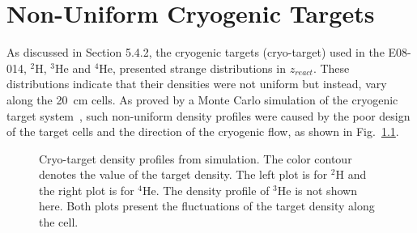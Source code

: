 \chapter{Non-Uniform Cryogenic Targets}
  As discussed in Section 5.4.2, the cryogenic targets (cryo-target) used in the E08-014, $\mathrm{^{2}H}$, $\mathrm{^{3}He}$ and $\mathrm{^{4}He}$, presented strange distributions in $z_{react}$. These distributions indicate that their densities were not uniform but instead, vary along the 20~cm cells. As proved by a Monte Carlo simulation of the cryogenic target system~\cite{silviu_target},  such non-uniform density profiles were caused by the poor design of the target cells and the direction of the cryogenic flow, as shown in Fig.~\ref{silviu_plots}.
\begin{figure}[!ht]
  \begin{center}
    \hfill
    \caption[Cryo-target density profiles from simulation]{\footnotesize{Cryo-target density profiles from simulation. The color contour denotes the value of the target density. The left plot is for $\mathrm{^{2}H}$ and the right plot is for $\mathrm{^{4}He}$. The density profile of $\mathrm{^{3}He}$ is not shown here. Both plots present the fluctuations of the target density along the cell.}}
    \label{silviu_plots}
  \end{center}
\end{figure}
 
